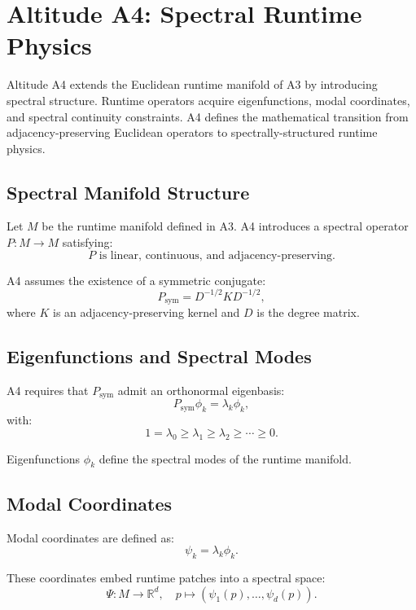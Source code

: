 
\section{Altitude A4: Spectral Runtime Physics}

Altitude A4 extends the Euclidean runtime manifold of A3 by introducing spectral
structure. Runtime operators acquire eigenfunctions, modal coordinates, and
spectral continuity constraints. A4 defines the mathematical transition from
adjacency-preserving Euclidean operators to spectrally-structured runtime
physics.

\subsection{Spectral Manifold Structure}

Let $M$ be the runtime manifold defined in A3. A4 introduces a spectral operator
$P : M \rightarrow M$ satisfying:
\[
P \text{ is linear, continuous, and adjacency-preserving}.
\]

A4 assumes the existence of a symmetric conjugate:
\[
P_{\mathrm{sym}} = D^{-1/2} K D^{-1/2},
\]
where $K$ is an adjacency-preserving kernel and $D$ is the degree matrix.

\subsection{Eigenfunctions and Spectral Modes}

A4 requires that $P_{\mathrm{sym}}$ admit an orthonormal eigenbasis:
\[
P_{\mathrm{sym}} \phi_k = \lambda_k \phi_k,
\]
with:
\[
1 = \lambda_0 \ge \lambda_1 \ge \lambda_2 \ge \cdots \ge 0.
\]

Eigenfunctions $\phi_k$ define the spectral modes of the runtime manifold.

\subsection{Modal Coordinates}

Modal coordinates are defined as:
\[
\psi_k = \lambda_k \phi_k.
\]

These coordinates embed runtime patches into a spectral space:
\[
\Psi : M \rightarrow \mathbb{R}^d, \quad p \mapsto (\psi_1(p), \ldots, \psi_d(p)).
\]

